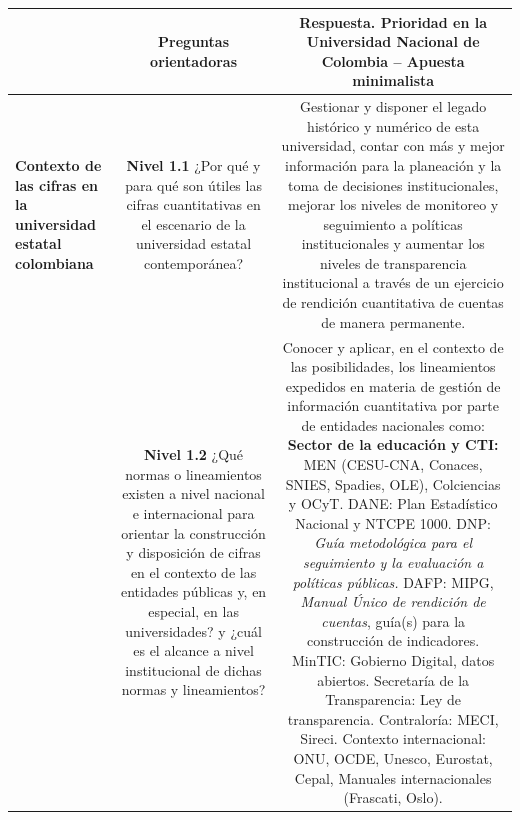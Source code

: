 \documentclass[
]{book}
\begin{document}
\begin{longtable}[]{@{}lcc@{}}
\toprule
\begin{minipage}[b]{0.04\columnwidth}\raggedright
\strut
\end{minipage} & \begin{minipage}[b]{0.18\columnwidth}\centering
\textbf{Preguntas orientadoras}\strut
\end{minipage} & \begin{minipage}[b]{0.69\columnwidth}\centering
\textbf{Respuesta. Prioridad en la Universidad Nacional de Colombia -- Apuesta minimalista}\strut
\end{minipage}\tabularnewline
\midrule
\endhead
\begin{minipage}[t]{0.04\columnwidth}\raggedright
\textbf{Contexto de las cifras en la universidad estatal colombiana}\strut
\end{minipage} & \begin{minipage}[t]{0.18\columnwidth}\centering
\textbf{Nivel 1.1} ¿Por qué y para qué son útiles las cifras cuantitativas en el escenario de la universidad estatal contemporánea?\strut
\end{minipage} & \begin{minipage}[t]{0.69\columnwidth}\centering
Gestionar y disponer el legado histórico y numérico de esta universidad, contar con más y mejor información para la planeación y la toma de decisiones institucionales, mejorar los niveles de monitoreo y seguimiento a políticas institucionales y aumentar los niveles de transparencia institucional a través de un ejercicio de rendición cuantitativa de cuentas de manera permanente.\strut
\end{minipage}\tabularnewline
\begin{minipage}[t]{0.04\columnwidth}\raggedright
\strut
\end{minipage} & \begin{minipage}[t]{0.18\columnwidth}\centering
\textbf{Nivel 1.2} ¿Qué normas o lineamientos existen a nivel nacional e internacional para orientar la construcción y disposición de cifras en el contexto de las entidades públicas y, en especial, en las universidades? y ¿cuál es el alcance a nivel institucional de dichas normas y lineamientos?\strut
\end{minipage} & \begin{minipage}[t]{0.69\columnwidth}\centering
Conocer y aplicar, en el contexto de las posibilidades, los lineamientos expedidos en materia de gestión de información cuantitativa por parte de entidades nacionales como: \textbf{Sector de la educación y CTI:} MEN (CESU-CNA, Conaces, SNIES, Spadies, OLE), Colciencias y OCyT. DANE: Plan Estadístico Nacional y NTCPE 1000. DNP: \emph{Guía metodológica para el seguimiento y la evaluación a políticas públicas.} DAFP: MIPG, \emph{Manual Único de rendición de cuentas}, guía(s) para la construcción de indicadores. MinTIC: Gobierno Digital, datos abiertos. Secretaría de la Transparencia: Ley de transparencia. Contraloría: MECI, Sireci. Contexto internacional: ONU, OCDE, Unesco, Eurostat, Cepal, Manuales internacionales (Frascati, Oslo).\strut

\end{minipage}
\end{longtable}
\end{document}
